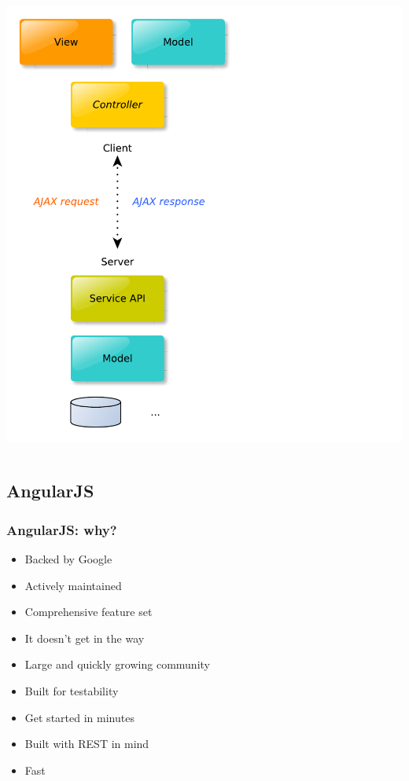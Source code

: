 \documentclass{beamer}
\begin{document}
\begin{frame}[fragile]
\begin{columns}[c]
    \begin{column}{4cm}
      \includegraphics[scale=0.40]{diagrams/spa_mvc.pdf}  
    \end{column}

  \end{columns}

\end{frame}




\subsection{AngularJS}
\begin{frame}[fragile]\frametitle{AngularJS: why?} 
  
  \begin{itemize}
    \item Backed by Google
    \item Actively maintained
    \item Comprehensive feature set
    \item It doesn't get in the way
    \item Large and quickly growing community
    \item Built for testability
    \item Get started in minutes
    \item Built with REST in mind
    \item Fast
  \end{itemize}

\end{frame}
\end{document}
